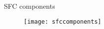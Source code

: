 \begin{frame}{SFC components}

  \begin{figure}
    \centering
    \texttt{[image: sfccomponents]}
  \end{figure}

\end{frame}